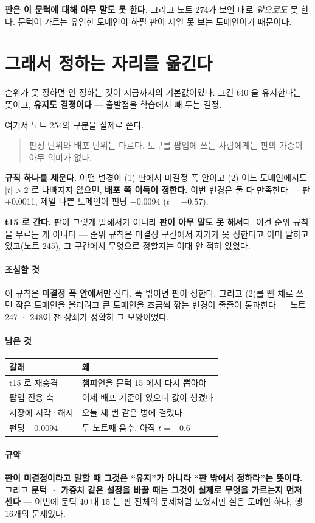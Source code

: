 \documentclass[10pt]{article}
\begin{document}
\textbf{판은 이 문턱에 대해 아무 말도 못 한다.} 그리고 노트 274가
보인 대로 \emph{앞으로도} 못 한다. 문턱이 가르는 유일한 도메인이 하필
판이 제일 못 보는 도메인이기 때문이다.

\section{그래서 정하는 자리를 옮긴다}

순위가 못 정하면 안 정하는 것이 지금까지의 기본값이었다. 그건 t40 을
유지한다는 뜻이고, \textbf{유지도 결정이다} --- 출발점을 학습에서 빼
두는 결정.

여기서 노트 254의 구분을 실제로 쓴다.

\begin{quote}\small
판정 단위와 배포 단위는 다르다. 도구를 팝업에 쓰는 사람에게는 판의
가중이 아무 의미가 없다.
\end{quote}

\textbf{규칙 하나를 세운다.} 어떤 변경이 (1) 판에서 미결정 폭 안이고
(2) 어느 도메인에서도 $|t|{>}2$ 로 나빠지지 않으면, \textbf{배포 쪽 이득이
정한다.} 이번 변경은 둘 다 만족한다 --- 판 $+$0.0011, 제일 나쁜 도메인이
펀딩 $-$0.0094 ($t{=}{-}0.57$).

\textbf{t15 로 간다.} 판이 그렇게 말해서가 아니라 \textbf{판이 아무 말도
못 해서}다. 이건 순위 규칙을 무르는 게 아니다 --- 순위 규칙은 미결정
구간에서 자기가 못 정한다고 이미 말하고 있고(노트 245), 그 구간에서
무엇으로 정할지는 여태 안 적혀 있었다.

\paragraph{조심할 것} 이 규칙은 \textbf{미결정 폭 안에서만} 산다. 폭
밖이면 판이 정한다. 그리고 (2)를 뺀 채로 쓰면 작은 도메인을 올리려고
큰 도메인을 조금씩 깎는 변경이 줄줄이 통과한다 --- 노트 247 · 248이 잰
상쇄가 정확히 그 모양이었다.

\paragraph{남은 것}
\begin{center}\small
\begin{tabular}{ll}
\hline
갈래 & 왜 \\
\hline
t15 로 재승격 & 챔피언을 문턱 15 에서 다시 뽑아야 \\
팝업 전용 축 & 이제 배포 기준이 있으니 값이 생겼다 \\
저장에 시각·해시 & 오늘 세 번 같은 병에 걸렸다 \\
펀딩 $-$0.0094 & 두 노트째 음수. 아직 $t{=}{-}0.6$ \\
\hline
\end{tabular}
\end{center}

\paragraph{규약} \textbf{판이 미결정이라고 말할 때 그것은 ``유지''가
아니라 ``판 밖에서 정하라''는 뜻이다.} 그리고 \textbf{문턱 · 가중치 같은
설정을 바꿀 때는 그것이 실제로 무엇을 가르는지 먼저 센다} --- 이번에
문턱 40 대 15 는 판 전체의 문제처럼 보였지만 실은 도메인 하나, 행 16개의
문제였다.
\end{document}
